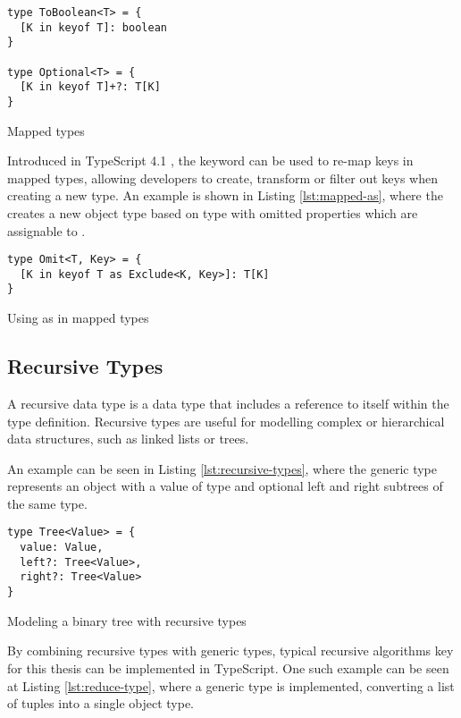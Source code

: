 \begin{listing}[ht]
  \begin{verbatim}
type ToBoolean<T> = {
  [K in keyof T]: boolean
}

type Optional<T> = {
  [K in keyof T]+?: T[K]
}
\end{verbatim}
  \caption{Mapped types}\label{lst:mapped-types}
\end{listing}

Introduced in TypeScript 4.1 \cite{AnnouncingTypeScript4.1}, the  keyword can be used to re-map keys in mapped types, allowing developers to create, transform or filter out keys when creating a new type. An example is shown in Listing \ref{lst:mapped-as}, where the  creates a new object type based on type  with omitted properties which are assignable to .

\begin{listing}[ht]
  \begin{verbatim}
type Omit<T, Key> = {
  [K in keyof T as Exclude<K, Key>]: T[K]
}
\end{verbatim}
  \caption{Using as in mapped types}\label{lst:mapped-as}
\end{listing}

\subsection{Recursive Types}

A recursive data type is a data type that includes a reference to itself within the type definition. Recursive types are useful for modelling complex or hierarchical data structures, such as linked lists or trees.

An example can be seen in Listing \ref{lst:recursive-types}, where the  generic type represents an object with a value of type  and optional left and right subtrees of the same type.

\begin{listing}[ht]
  \begin{verbatim}
type Tree<Value> = {
  value: Value,
  left?: Tree<Value>,
  right?: Tree<Value>
}
\end{verbatim}
  \caption{Modeling a binary tree with recursive types}\label{lst:recursive-types}
\end{listing}

By combining recursive types with generic types, typical recursive algorithms key for this thesis can be implemented in TypeScript. One such example can be seen at Listing \ref{lst:reduce-type}, where a  generic type is implemented, converting a list of  tuples into a single object type.

